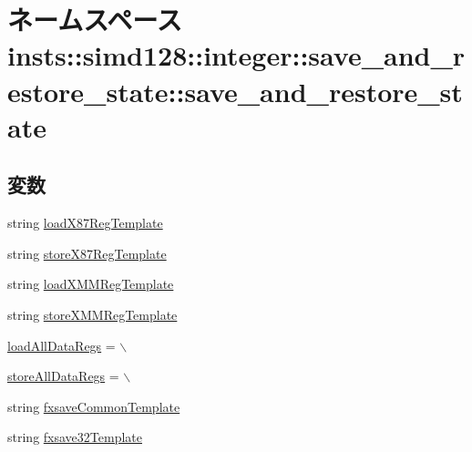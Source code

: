 \hypertarget{namespaceinsts_1_1simd128_1_1integer_1_1save__and__restore__state_1_1save__and__restore__state}{
\section{ネームスペース insts::simd128::integer::save\_\-and\_\-restore\_\-state::save\_\-and\_\-restore\_\-state}
\label{namespaceinsts_1_1simd128_1_1integer_1_1save__and__restore__state_1_1save__and__restore__state}
}
\subsection*{変数}
\begin{DoxyCompactItemize}
\item 
string \hyperlink{namespaceinsts_1_1simd128_1_1integer_1_1save__and__restore__state_1_1save__and__restore__state_a5a6854c32ce1e83c503679679b8e2242}{loadX87RegTemplate}
\item 
string \hyperlink{namespaceinsts_1_1simd128_1_1integer_1_1save__and__restore__state_1_1save__and__restore__state_a01cd3787b709e78724b65b609760b5ac}{storeX87RegTemplate}
\item 
string \hyperlink{namespaceinsts_1_1simd128_1_1integer_1_1save__and__restore__state_1_1save__and__restore__state_ae9677895981b19668ad03f0338499048}{loadXMMRegTemplate}
\item 
string \hyperlink{namespaceinsts_1_1simd128_1_1integer_1_1save__and__restore__state_1_1save__and__restore__state_a699e17f830f92abd44d0036d0c5338b0}{storeXMMRegTemplate}
\item 
\hyperlink{namespaceinsts_1_1simd128_1_1integer_1_1save__and__restore__state_1_1save__and__restore__state_a4c336f75776a67ec7e56c09e918c4f21}{loadAllDataRegs} = $\backslash$
\item 
\hyperlink{namespaceinsts_1_1simd128_1_1integer_1_1save__and__restore__state_1_1save__and__restore__state_a920ea44080ee0ea60dfc04d0bb712a51}{storeAllDataRegs} = $\backslash$
\item 
string \hyperlink{namespaceinsts_1_1simd128_1_1integer_1_1save__and__restore__state_1_1save__and__restore__state_aac142ffb713d0c2d93b20507b0478beb}{fxsaveCommonTemplate}
\item 
string \hyperlink{namespaceinsts_1_1simd128_1_1integer_1_1save__and__restore__state_1_1save__and__restore__state_ab29e39028b1b1e576cacf8ff8e222686}{fxsave32Template}

\end{DoxyCompactItemize}
